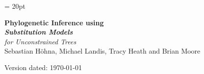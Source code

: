 \documentclass[11pt]{article}
\begin{document}
\renewcommand{\headrulewidth}{0.5pt}
\headsep = 20pt
\lhead{ }

\thispagestyle{plain}
\begin{center}

\textbf{\LARGE Phylogenetic Inference using \RevBayes}\\\vspace{2mm}
\textbf{\it{\Large Substitution Models}}\\\vspace{2mm}
{\it {\Large for Unconstrained Trees}}\\\vspace{2mm}
\vspace{1cm}
{\Large Sebastian H{\"o}hna, Michael Landis, Tracy Heath and Brian Moore}
\vspace{1cm}
\end{center}

\def \ResourcePath {./}
\def \GlobalResourcePath {../}


Version dated: \today
\end{document}
